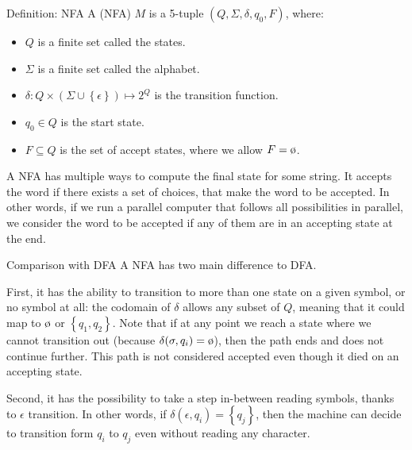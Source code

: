\documentclass[a4paper]{article}
\begin{document}
\begin{parag}{Definition: NFA}
    A  (NFA) $M$ is a 5-tuple $\left(Q, \Sigma, \delta, q_0, F\right)$, where:
    \begin{itemize}
        \item $Q$ is a finite set called the states.
        \item $\Sigma$ is a finite set called the alphabet.
        \item $\delta: Q \times \left(\Sigma \cup \left\{\epsilon\right\}\right) \mapsto 2^Q$ is the transition function.
        \item $q_0 \in Q$ is the start state.
        \item $F \subseteq Q$ is the set of accept states, where we allow $F = \o$.
    \end{itemize}

    A NFA has multiple ways to compute the final state for some string. It accepts the word if there exists a set of choices, that make the word to be accepted. In other words, if we run a parallel computer that follows all possibilities in parallel, we consider the word to be accepted if any of them are in an accepting state at the end.
    
    \begin{subparag}{Comparison with DFA}
        A NFA has two main difference to DFA. 

        First, it has the ability to transition to more than one state on a given symbol, or no symbol at all: the codomain of $\delta$ allows any subset of $Q$, meaning that it could map to $\o$ or $\left\{q_1, q_2\right\}$. Note that if at any point we reach a state where we cannot transition out (because $\delta\left(\sigma, q_i\right) = \o$), then the path ends and does not continue further. This path is not considered accepted even though it died on an accepting state.

        Second, it has the possibility to take a step in-between reading symbols, thanks to $\epsilon$ transition. In other words, if $\delta\left(\epsilon, q_i\right) = \left\{q_j\right\}$, then the machine can decide to transition form $q_i$ to $q_j$ even without reading any character.
    \end{subparag}
\end{parag}
\end{document}
